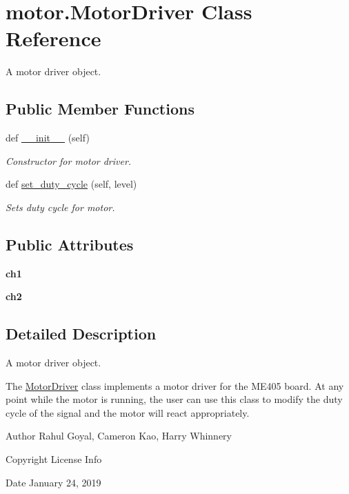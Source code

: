 \hypertarget{classmotor_1_1_motor_driver}{}\section{motor.\+Motor\+Driver Class Reference}
\label{classmotor_1_1_motor_driver}


A motor driver object.  


\subsection*{Public Member Functions}
\begin{DoxyCompactItemize}
\item 
def \mbox{\hyperlink{classmotor_1_1_motor_driver_a9e10ee95953b802b06ad4b9b3b6e35b9}{\+\_\+\+\_\+init\+\_\+\+\_\+}} (self)
\begin{DoxyCompactList}\small\item\em Constructor for motor driver. \end{DoxyCompactList}\item 
def \mbox{\hyperlink{classmotor_1_1_motor_driver_a51b4721406aa66e0807413199b8b700f}{set\+\_\+duty\+\_\+cycle}} (self, level)
\begin{DoxyCompactList}\small\item\em Sets duty cycle for motor. \end{DoxyCompactList}\end{DoxyCompactItemize}
\subsection*{Public Attributes}
\begin{DoxyCompactItemize}
\item 
\mbox{\label{classmotor_1_1_motor_driver_ab59ff180f9593d716a60d0177cd8564e}} 
{\bfseries ch1}
\item 
\mbox{\label{classmotor_1_1_motor_driver_af47581f527f4163d62810c617e081001}} 
{\bfseries ch2}
\end{DoxyCompactItemize}


\subsection{Detailed Description}
A motor driver object. 

The \mbox{\hyperlink{classmotor_1_1_motor_driver}{Motor\+Driver}} class implements a motor driver for the M\+E405 board. At any point while the motor is running, the user can use this class to modify the duty cycle of the signal and the motor will react appropriately. \begin{DoxyAuthor}{Author}
Rahul Goyal, Cameron Kao, Harry Whinnery 
\end{DoxyAuthor}
\begin{DoxyCopyright}{Copyright}
License Info 
\end{DoxyCopyright}
\begin{DoxyDate}{Date}
January 24, 2019 
\end{DoxyDate}


